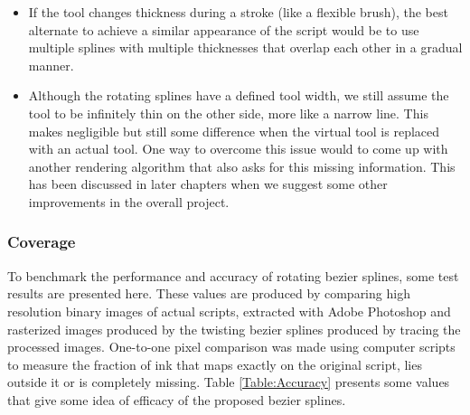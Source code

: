 \begin{itemize}
\item If the tool changes thickness during a stroke (like a flexible brush), the best alternate to achieve a similar appearance of the script would be to use multiple splines with multiple thicknesses that overlap each other in a gradual manner.
\item Although the rotating splines have a defined tool width, we still assume the tool to be infinitely thin on the other side, more like a narrow line. This makes negligible but still some difference when the virtual tool is replaced with an actual tool. One way to overcome this issue would to come up with another rendering algorithm that also asks for this missing information. This has been discussed in later chapters when we suggest some other improvements in the overall project.
\end{itemize}
\subsubsection{Coverage}
To benchmark the performance and accuracy  of rotating bezier splines, some test results are presented here. These values are produced by comparing high resolution binary images of actual scripts, extracted with Adobe Photoshop and rasterized images produced by the twisting bezier splines produced by tracing the processed images. One-to-one pixel comparison was made using computer scripts to measure the fraction of ink that maps exactly on the original script, lies outside it or is completely missing. Table \ref{Table:Accuracy} presents some values that give some idea of efficacy of the proposed bezier splines.
\begin{table}[ht]
\centering
{}
\caption{Benchmark of the mathematical accuracy of the twisting bezier spline curves}
\end{table}

